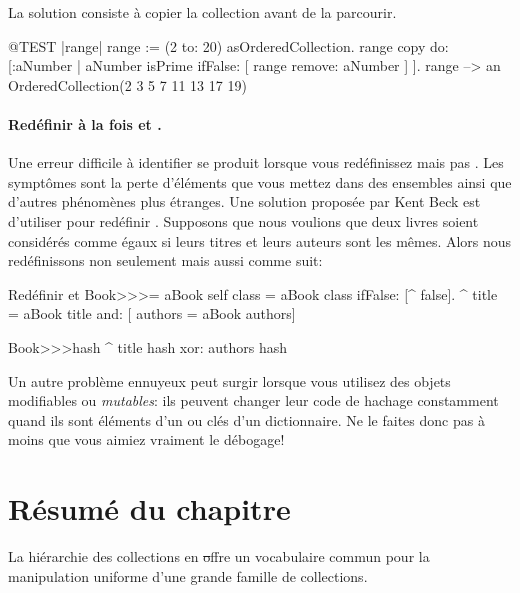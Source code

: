 \documentclass[a4paper,10pt,twoside]{book}
\begin{document}
La solution consiste à copier la collection avant de la parcourir.
\begin{code}{@TEST |range|}
range := (2 to: 20) asOrderedCollection.
range copy do: [:aNumber | aNumber isPrime ifFalse: [ range remove: aNumber ] ].
range --> an OrderedCollection(2 3 5 7 11 13 17 19)
\end{code}

\paragraph{Redéfinir à la fois \ct{=} et .}
Une erreur difficile à identifier se produit lorsque vous
redéfinissez \ct{=} mais pas . Les symptômes sont
la perte d'éléments que vous mettez dans des ensembles ainsi
que d'autres phénomènes plus étranges. Une solution proposée
par Kent Beck est d'utiliser  pour redéfinir .
Supposons que nous voulions que deux livres soient considérés comme
égaux si leurs titres et leurs auteurs sont les mêmes.
Alors nous redéfinissons non seulement
\ct{=} mais aussi  comme suit:

\begin{method}{Redéfinir \ct{=} et }
Book>>>= aBook
   self class = aBook class ifFalse: [^ false].
   ^ title = aBook title and: [ authors = aBook authors]

Book>>>hash 
   ^ title hash xor: authors hash
\end{method}

Un autre problème ennuyeux peut surgir lorsque vous utilisez des
objets modifiables ou \emph{mutables}: ils peuvent changer leur
code de hachage constamment quand ils sont éléments d'un 
ou clés d'un dictionnaire. 
Ne le faites donc pas à moins que vous aimiez vraiment le débogage!

\section{Résumé du chapitre}

La hiérarchie des collections en \st offre un vocabulaire commun pour la manipulation uniforme d'une grande famille de collections.
\end{document}
